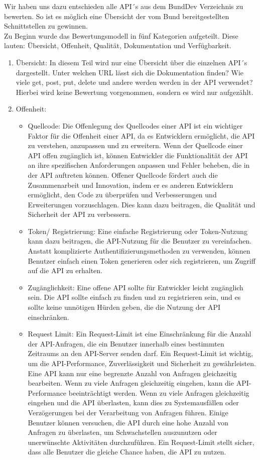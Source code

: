 \documentclass[notitlepage, hidelinks]{article}
\begin{document}
Wir haben uns dazu entschieden alle API´s aus dem BundDev Verzeichnis zu bewerten. So ist es möglich eine Übersicht der vom Bund bereitgestellten Schnittstellen zu gewinnen. \\
Zu Beginn wurde das Bewertungsmodell in fünf Kategorien aufgeteilt. Diese lauten: Übersicht, Offenheit, Qualität, Dokumentation und Verfügbarkeit.
\begin{enumerate}
\item Übersicht: In diesem Teil wird nur eine Übersicht über die einzelnen API´s dargestellt. Unter welchen URL lässt sich die Dokumentation finden? Wie viele get, post, put, delete und andere werden werden in der API verwendet? Hierbei wird keine Bewertung vorgenommen, sondern es wird nur aufgezählt.
\item Offenheit: 
\begin{itemize}
\item Quellcode: Die Offenlegung des Quellcodes einer API ist ein wichtiger Faktor für die Offenheit einer API, da es Entwicklern ermöglicht, die API zu verstehen, anzupassen und zu erweitern. Wenn der Quellcode einer API offen zugänglich ist, können Entwickler die Funktionalität der API an ihre spezifischen Anforderungen anpassen und Fehler beheben, die in der API auftreten können. Offener Quellcode fördert auch die Zusammenarbeit und Innovation, indem er es anderen Entwicklern ermöglicht, den Code zu überprüfen und Verbesserungen und Erweiterungen vorzuschlagen. Dies kann dazu beitragen, die Qualität und Sicherheit der API zu verbessern.
\item Token/ Registrierung: Eine einfache Registrierung oder Token-Nutzung kann dazu beitragen, die API-Nutzung für die Benutzer zu vereinfachen. Anstatt komplizierte Authentifizierungsmethoden zu verwenden, können Benutzer einfach einen Token generieren oder sich registrieren, um Zugriff auf die API zu erhalten.
\item Zugänglichkeit: Eine offene API sollte für Entwickler leicht zugänglich sein. Die API sollte einfach zu finden und zu registrieren sein, und es sollte keine unnötigen Hürden geben, die die Nutzung der API einschränken.
\item Request Limit: Ein Request-Limit ist eine Einschränkung für die Anzahl der API-Anfragen, die ein Benutzer innerhalb eines bestimmten Zeitraums an den API-Server senden darf. Ein Request-Limit ist wichtig, um die API-Performance, Zuverlässigkeit und Sicherheit zu gewährleisten.
Eine API kann nur eine begrenzte Anzahl von Anfragen gleichzeitig bearbeiten. Wenn zu viele Anfragen gleichzeitig eingehen, kann die API-Performance beeinträchtigt werden. Wenn zu viele Anfragen gleichzeitig eingehen und die API überlasten, kann dies zu Systemausfällen oder Verzögerungen bei der Verarbeitung von Anfragen führen. Einige Benutzer können versuchen, die API durch eine hohe Anzahl von Anfragen zu überlasten, um Schwachstellen auszunutzen oder unerwünschte Aktivitäten durchzuführen. Ein Request-Limit stellt sicher, dass alle Benutzer die gleiche Chance haben, die API zu nutzen.

\end{itemize}
\end{enumerate}
\end{document}
